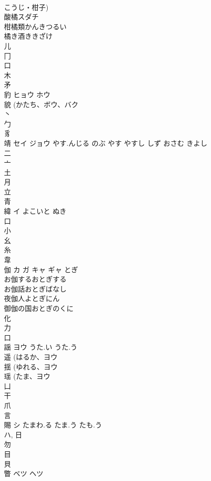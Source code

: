 \documentclass[8pt]{extreport}
\begin{document}
\begin{CJK}{UTF8}{min}
\\	こうじ・柑子)
\\	酸橘スダチ 
\\	柑橘類かんきつるい 
\\	橘き酒ききざけ 
\\	儿 
\\	冂 
\\	口 
\\	木 
\\	矛 
\\	豹	ヒョウ ホウ		
\\	貌 (かたち、ボウ、バク 
\\	丶 
\\	勹 
\\	豸 
\\	靖	セイ ジョウ	やす.んじる のぶ やす やすし しず おさむ きよし	
\\	二 
\\	亠 
\\	土 
\\	月 
\\	立 
\\	青 
\\	緯	イ	よこいと ぬき	
\\	口 
\\	小 
\\	幺 
\\	糸 
\\	韋 
\\	伽	カ ガ キャ ギャ	とぎ	
\\	お伽するおとぎする
\\	お伽話おとぎばなし
\\	夜伽人よとぎにん
\\	御伽の国おとぎのくに
\\	化 
\\	力 
\\	口 
\\	謡	ヨウ	うた.い うた.う	
\\	遥 (はるか、ヨウ 
\\	揺 (ゆれる、ヨウ 
\\	瑶 (たま、ヨウ 
\\	凵 
\\	干 
\\	爪 
\\	言 
\\	賜	シ	たまわ.る たま.う たも.う	
\\	ハ, 日 
\\	勿 
\\	目 
\\	貝 
\\	瞥	ベツ ヘツ		

\end{CJK}
\end{document}
